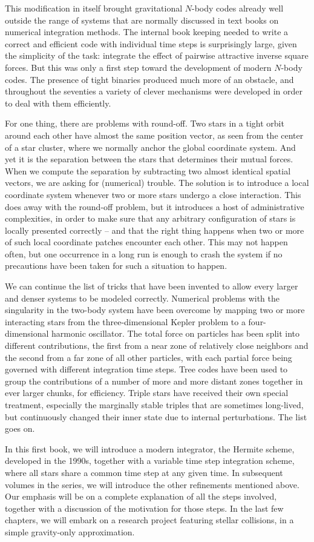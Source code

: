This modification in itself brought gravitational $N$-body codes already
well outside the range of systems that are normally discussed in text
books on numerical integration methods.  The internal book keeping
needed to write a correct and efficient code with individual time
steps is surprisingly large, given the simplicity of the task:
integrate the effect of pairwise attractive inverse square forces.
But this was only a first step toward the development of modern $N$-body
codes.  The presence of tight binaries produced much more of an obstacle,
and throughout the seventies a variety of clever mechanisms were developed
in order to deal with them efficiently.

For one thing, there are problems with round-off.  Two stars in a tight
orbit around each other have almost the same position vector, as seen
from the center of a star cluster, where we normally anchor the global
coordinate system.  And yet it is the separation between the stars
that determines their mutual forces.  When we compute the separation
by subtracting two almost identical spatial vectors, we are asking for
(numerical) trouble.  The solution is to introduce a local coordinate
system whenever two or more stars undergo a close interaction.  This
does away with the round-off problem, but it introduces a host of
administrative complexities, in order to make sure that any arbitrary
configuration of stars is locally presented correctly -- and that the
right thing happens when two or more of such local coordinate patches
encounter each other.  This may not happen often, but one occurrence
in a long run is enough to crash the system if no precautions have
been taken for such a situation to happen.

We can continue the list of tricks that have been invented to allow
every larger and denser systems to be modeled correctly.  Numerical
problems with the singularity in the two-body system have been
overcome by mapping two or more interacting stars from the
three-dimensional Kepler problem to a four-dimensional harmonic
oscillator.  The total force on particles has been split into
different contributions, the first from a near zone of relatively
close neighbors and the second from a far zone of all other particles,
with each partial force being governed with different integration time
steps.  Tree codes have been used to group the contributions of a
number of more and more distant zones together in ever larger chunks,
for efficiency.  Triple stars have received their own special treatment,
especially the marginally stable triples that are sometimes long-lived, 
but continuously changed their inner state due to internal perturbations.
The list goes on.

In this first book, we will introduce a modern integrator, the Hermite
scheme, developed in the 1990s, together with a variable time step
integration scheme, where all stars share a common time step at any
given time.  In subsequent volumes in the series, we will introduce
the other refinements mentioned above.  Our emphasis will be on a
complete explanation of all the steps involved, together with a
discussion of the motivation for those steps.  In the last few
chapters, we will embark on a research project featuring stellar
collisions, in a simple gravity-only approximation.
